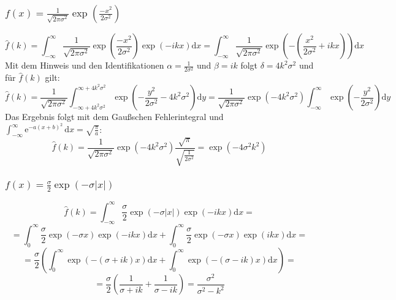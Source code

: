\documentclass[a4paper,11pt]{article}
\begin{document}
\subsubsection{$f(x) = \frac{1}{\sqrt{2\pi\sigma^2}}\exp(\frac{-x^2}{2\sigma^2})$}
\begin{equation}
        \hat{f}(k) = \int_{-\infty}^\infty \frac{1}{\sqrt{2\pi\sigma^2}}\exp(\frac{-x^2}{2\sigma^2}) \exp(-ikx)\text{d}x = \int_{-\infty}^\infty \frac{1}{\sqrt{2\pi\sigma^2}}\exp(-(\frac{x^2}{2\sigma^2} + ikx))\text{d}x
\end{equation}
Mit dem Hinweis und den Identifikationen $\alpha = \frac{1}{2\sigma^2}$ und $\beta = ik$ folgt $\delta = 4k^2\sigma^2$ und für $\hat{f}(k)$ gilt:
\begin{equation}
        \hat{f}(k) = \frac{1}{\sqrt{2\pi\sigma^2}}\int_{-\infty + 4k^2\sigma^2}^{\infty + 4k^2\sigma^2} \exp(-\frac{y^2}{2\sigma^2} - 4k^2\sigma^2)\text{d}y = \frac{1}{\sqrt{2\pi\sigma^2}}\exp(-4k^2\sigma^2)\int_{-\infty}^{\infty} \exp(-\frac{y^2}{2\sigma^2})\text{d}y
\end{equation}
Das Ergebnis folgt mit dem Gaußschen Fehlerintegral und $\int_{-\infty}^{\infty} \text{e}^{-a(x+b)^2}\,\text{d}x= \sqrt{\frac{\pi}{a}}$:
\begin{equation}
        \hat{f}(k) = \frac{1}{\sqrt{2\pi\sigma^2}}\exp(-4k^2\sigma^2) \frac{\sqrt{\pi}}{\sqrt{\frac{1}{2\sigma^2}}} = \exp(-4\sigma^2k^2)
\end{equation}

\subsubsection{$f(x) = \frac{\sigma}{2}\exp(-\sigma|x|)$}

\begin{equation}
        \hat{f}(k) = \int_{-\infty}^\infty \frac{\sigma}{2}\exp(-\sigma|x|) \exp(-ikx)\text{d}x = 
\end{equation}
\begin{equation}
        = \int_0^\infty\frac{\sigma}{2}\exp(-\sigma x) \exp(-ikx)\text{d}x + \int_0^\infty\frac{\sigma}{2}\exp(-\sigma x) \exp(ikx)\text{d}x = 
\end{equation}
\begin{equation}
        = \frac{\sigma}{2} (\int_0^\infty\exp(-(\sigma + ik)x)\text{d}x + \int_0^\infty\exp(-(\sigma - ik)x)\text{d}x) = 
\end{equation}
\begin{equation}
        = \frac{\sigma}{2} (\frac{1}{\sigma + ik} + \frac{1}{\sigma - ik}) = \frac{\sigma^2}{\sigma^2 - k^2}
\end{equation}
\end{document}
